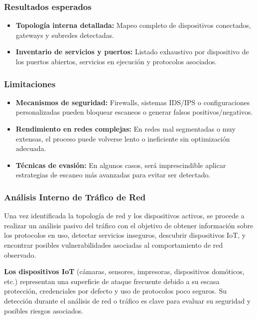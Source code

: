 \documentclass[a4paper, 11pt]{article}
\begin{document}
\subsubsection*{Resultados esperados}
\begin{itemize}

    \item \textbf{Topología interna detallada:} Mapeo completo de dispositivos conectados, gateways y subredes detectadas. 
    
    \item \textbf{Inventario de servicios y puertos:} Listado exhaustivo por dispositivo de los puertos abiertos, servicios en ejecución y protocolos asociados.
\end{itemize}

\subsubsection*{Limitaciones}

\begin{itemize}
   
    \item \textbf{Mecanismos de seguridad:} Firewalls, sistemas IDS/IPS o configuraciones personalizadas pueden bloquear escaneos o generar falsos positivos/negativos.
    
    \item \textbf{Rendimiento en redes complejas:} En redes mal segmentadas o muy extensas, el proceso puede volverse lento o ineficiente sin optimización adecuada.
    
    \item \textbf{Técnicas de evasión:} En algunos casos, será imprescindible aplicar estrategias de escaneo más avanzadas para evitar ser detectado.
\end{itemize}



\subsubsection{Análisis Interno de Tráfico de Red}

Una vez identificada la topología de red y los dispositivos activos, se procede a realizar un análisis pasivo del tráfico con el objetivo 
de obtener información sobre los protocolos en uso, detectar servicios inseguros, descubrir dispositivos IoT, y encontrar posibles vulnerabilidades asociadas al comportamiento de red observado.


\textbf{Los dispositivos IoT} (cámaras, sensores, impresoras, dispositivos domóticos, etc.) representan una superficie de 
ataque frecuente debido a su escasa protección, credenciales por defecto y uso de protocolos poco seguros. Su detección durante 
el análisis de red o tráfico es clave para evaluar su seguridad y posibles riesgos asociados.
\end{document}
